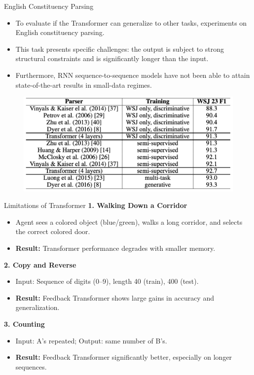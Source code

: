 \documentclass{beamer}
\begin{document}
\begin{frame}{English Constituency Parsing}
\begin{itemize}
    \item To evaluate if the Transformer can generalize to other tasks, experiments on English constituency parsing.
    
    \item This task presents specific challenges: the output is subject to strong structural constraints and is significantly longer than the input. 
    
    \item Furthermore, RNN sequence-to-sequence models have not been able to attain state-of-the-art results in small-data regimes.
\end{itemize}

\begin{figure}
    \centering
    \includegraphics[width=0.8\linewidth]{f23.png}
    \label{fig:enter-label}
\end{figure}
\end{frame}

\begin{frame}{Limitations of Transformer}\renewcommand{\thefootnote}{}
\textbf{1. Walking Down a Corridor}
\begin{itemize}
    \item Agent sees a colored object (blue/green), walks a long corridor, and selects the correct colored door.
    \item \textbf{Result:} Transformer performance degrades with smaller memory.
\end{itemize}

\textbf{2. Copy and Reverse}
\begin{itemize}
    \item Input: Sequence of digits (0–9), length 40 (train), 400 (test).
    \item \textbf{Result:} Feedback Transformer shows large gains in accuracy and generalization.
\end{itemize}

\textbf{3. Counting}
\begin{itemize}
    \item Input: A’s repeated; Output: same number of B’s.
    \item \textbf{Result:} Feedback Transformer significantly better, especially on longer sequences.
\end{itemize}
    
\end{frame}
\end{document}
